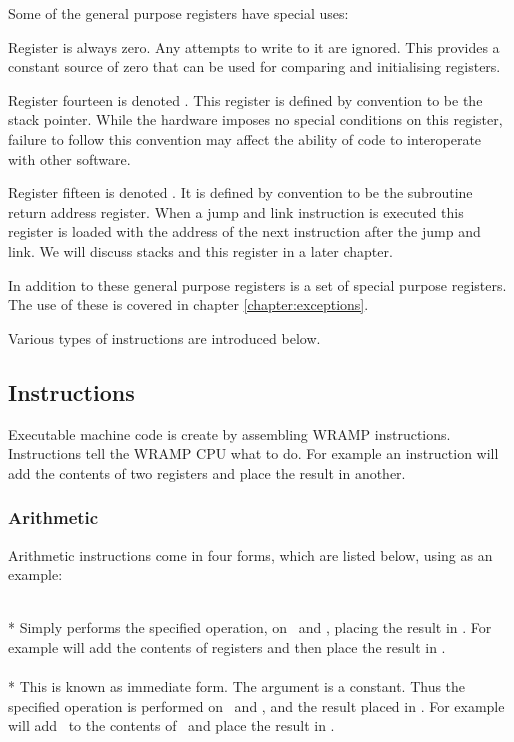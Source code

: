 Some of the general purpose registers have special uses:

Register  is always zero.  Any attempts to write to it are
ignored.  This provides a constant source of zero that can be used for
comparing and initialising registers.

Register fourteen is denoted . This register is defined by
convention to be the stack pointer.  While the hardware imposes no
special conditions on this register, failure to follow this convention
may affect the ability of code to interoperate with other software.

Register fifteen is denoted . It is defined by convention to
be the subroutine return address register.  When a jump and link
instruction is executed this register is loaded with the address of
the next instruction after the jump and link. We will discuss stacks
and this register in a later chapter.

In addition to these general purpose registers is a set of special
purpose registers.  The use of these is covered in chapter
\ref{chapter:exceptions}.

Various types of instructions are introduced below.

\subsection{Instructions}

Executable machine code is create by assembling WRAMP instructions.
Instructions tell the WRAMP CPU what to do.  For example an  
instruction will add the contents of two registers and place the result 
in another.

\subsubsection{Arithmetic}
Arithmetic instructions come in four forms, which are listed 
below, using  as an example:


 \\*
  Simply performs the specified operation,
  on \regs\ and \regt, placing the result in \regd.  For example 
  \mbox{} will add the contents of registers
   and  then place the result in .
  \\

 \\* 
  This is known as immediate form.
  The argument  is a constant.  Thus the specified
  operation is performed on \regs\ and , and the result
  placed in \regd.  For example \mbox{} will add
  \ to the contents of \ and place the result in
  .  
  \\

